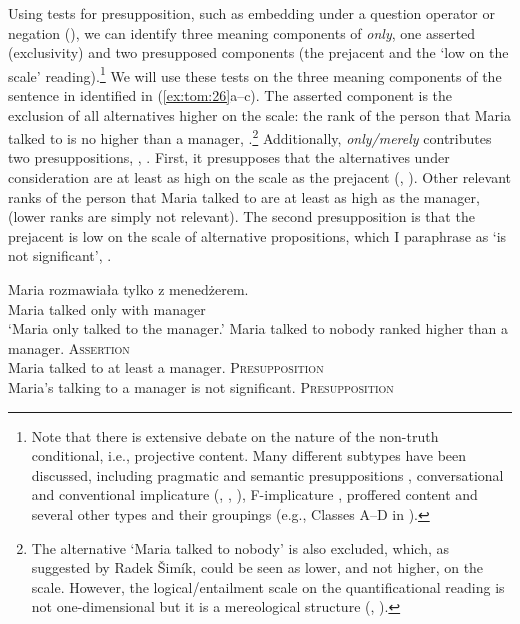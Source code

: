 \documentclass[output=paper,colorlinks,citecolor=brown]{langscibook}
\begin{document}
Using tests for presupposition, such as embedding under a question operator or negation (\citealt{chierchiamcconnellginet90}), we can identify three meaning components of \textit{only}, one asserted (exclusivity) and two presupposed components (the prejacent and the ‘low on the scale’ reading).\footnote{Note that there is extensive debate on the nature of the non-truth conditional, i.e., projective content. Many different subtypes have been discussed, including pragmatic and semantic presuppositions \citep{stalnaker73}, conversational and conventional implicature (\citealt{grice81}, \citealt{bach94}, \citealt{Potts2005,potts15}), F-implicature \citep{horn13}, proffered content \citep{roberts96} and several other types and their groupings (e.g., Classes A--D in \citealt{tonhauser+13}).} 
We will use these tests on the three meaning components of the sentence in  identified in (\ref{ex:tom:26}a--c). The asserted component is the exclusion of all alternatives higher on the scale: the rank of the person that Maria talked to is no higher than a manager, .\footnote{The alternative `Maria talked to nobody' is also excluded, which, as suggested by Radek Šimík, could be seen as lower, and not higher, on the scale. However, the logical/entailment scale on the quantificational reading is not one-dimensional but it is a mereological structure (\citealt{riester06}, \citealt{coppockbeaver11}).} \noindent Additionally, \textit{only/merely} contributes two presuppositions, , . First, it presupposes that the alternatives under consideration are at least as high on the scale as the prejacent (\citealt{klinedinst05}, \citealt{beaverclark08}). Other relevant ranks of the person that Maria talked to are at least as high as the manager,  (lower ranks are simply not relevant). The second presupposition is that the prejacent is low on the scale of alternative propositions, which I paraphrase as ‘is not significant’,  \citep{klinedinst05}. 


\ea\label{ex:tom:26}
\gll Maria rozmawiała tylko z menedżerem.\\
 Maria talked only with manager\\
\glt `Maria only talked to the manager.’
\ea\label{ex:tom:26a}
Maria talked to nobody ranked higher than a manager. \hfill \textsc{Assertion}\\
\ex\label{ex:tom:26b}
Maria talked to at least a manager. \hfill \textsc{Presupposition}\\
\ex\label{ex:tom:26c}
Maria’s talking to a manager is not significant. \hfill \textsc{Presupposition}
\z 
\z 
\end{document}
